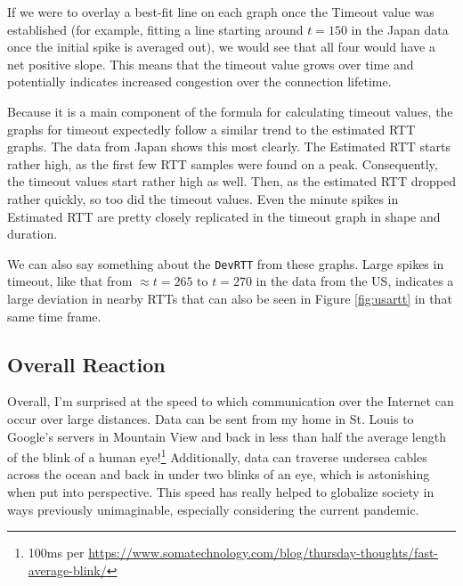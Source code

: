 \documentclass[11pt]{article}
\begin{document}
  If we were to overlay a best-fit line on each graph once the Timeout value was 
  established (for example, fitting a line starting around $t=150$ in the Japan 
  data once the initial spike is averaged out), we would see that all four would have 
  a net positive slope. This means that the timeout value grows over time and potentially indicates  
  increased congestion over the connection lifetime.

  Because it is a main component of the formula for calculating timeout values, the graphs for 
  timeout expectedly follow a similar trend to the estimated RTT graphs. The data from Japan 
  shows this most clearly. The Estimated RTT starts rather high, as the first few RTT samples 
  were found on a peak. Consequently, the timeout values start rather high as well. Then, as 
  the estimated RTT dropped rather quickly, so too did the timeout values. Even the minute 
  spikes in Estimated RTT are pretty closely replicated in the timeout graph in shape 
  and duration.

  We can also say something about the \texttt{DevRTT} from these graphs. Large spikes in 
  timeout, like that from $\approx t=265 \text{ to } t=270$ in the data from the 
  US, indicates a large deviation 
  in nearby RTTs that can also be seen in Figure \ref{fig:usartt} in that same time frame.

  \subsection{Overall Reaction}
  Overall, I'm surprised at the speed to which communication over the Internet can occur 
  over large distances. Data can be sent from my home in St. Louis to Google's servers 
  in Mountain View and back in less than half the average length of the blink of a 
  human eye!\footnote{100ms per \url{https://www.somatechnology.com/blog/thursday-thoughts/fast-average-blink/}} 
  Additionally, data can traverse undersea cables across the ocean and back in under 
  two blinks of an eye, which is astonishing when put into perspective. This speed 
  has really helped to globalize society in ways previously unimaginable, especially 
  considering the current pandemic.
\end{document}
